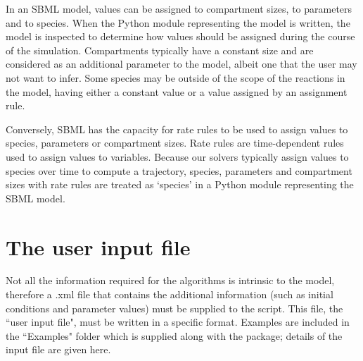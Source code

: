 \documentclass[a4paper]{report}
\begin{document}
In an SBML model, values can be assigned to compartment sizes, to parameters and to species. When the Python module representing the model is written, the model is inspected to determine how values should be assigned during the course of the simulation. Compartments typically have a constant size and are considered as an additional parameter to the model, albeit one that the user may not want to infer. Some species may be outside of the scope of the reactions in the model, having either a constant value or a value assigned by an assignment rule. 

Conversely, SBML has the capacity for rate rules to be used to assign values to species, parameters or compartment sizes. Rate rules are time-dependent rules used to assign values to variables. Because our solvers typically assign values to species over time to compute a trajectory, species, parameters and compartment sizes with rate rules are treated as `species' in a Python module representing the SBML model.

\section{The user input file}
Not all the information required for the algorithms is intrinsic to the model, therefore a .xml file that contains the additional information (such as initial conditions and parameter values) must be supplied to the script. This file,  the ``user input file", must be written in a specific format. Examples are included in the ``Examples" folder which is supplied along with the package; details of the input file are given here.
\end{document}
